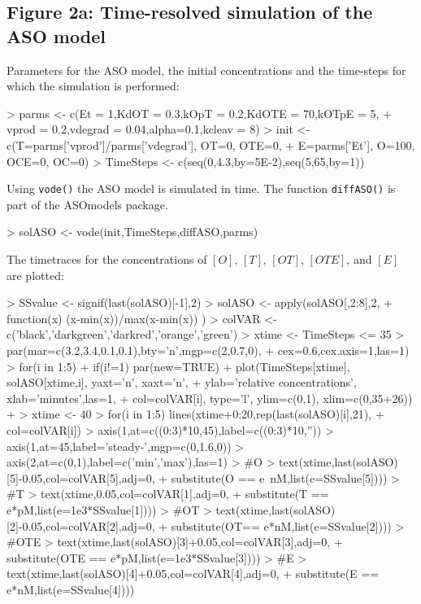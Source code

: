 \documentclass{article}
\begin{document}
\subsection*{Figure 2a: Time-resolved simulation of the ASO model}
Parameters for the ASO model, the initial concentrations and the time-steps for which the simulation is performed:
\begin{Schunk}
\begin{Sinput}
> parms <- c(Et = 1,KdOT = 0.3,kOpT = 0.2,KdOTE = 70,kOTpE = 5,  
+            vprod = 0.2,vdegrad = 0.04,alpha=0.1,kcleav = 8)
> init <- c(T=parms['vprod']/parms['vdegrad'], OT=0, OTE=0, 
+           E=parms['Et'], O=100, OCE=0, OC=0)
> TimeSteps <- c(seq(0,4.3,by=5E-2),seq(5,65,by=1))
\end{Sinput}
\end{Schunk}
Using \texttt{vode()} the ASO model is simulated in time. The function \texttt{diffASO()} is part of the ASOmodels package. 
\begin{Schunk}
\begin{Sinput}
> solASO <- vode(init,TimeSteps,diffASO,parms)
\end{Sinput}
\end{Schunk}
The timetraces for the concentrations of $[O]$, $[T]$, $[OT]$, $[OTE]$, and $[E]$ are plotted:
\begin{Schunk}
\begin{Sinput}
> SSvalue <- signif(last(solASO)[-1],2)
> solASO <- apply(solASO[,2:8],2,
+                 function(x) (x-min(x))/max(x-min(x)) )
> colVAR <- c('black','darkgreen','darkred','orange','green')
> xtime <- TimeSteps <= 35
> par(mar=c(3.2,3.4,0.1,0.1),bty='n',mgp=c(2,0.7,0),
+     cex=0.6,cex.axis=1,las=1)
> for(i in 1:5){ 
+   if(i!=1) par(new=TRUE)
+   plot(TimeSteps[xtime], solASO[xtime,i], yaxt='n', xaxt='n',
+        ylab='relative concentrations', xlab='minutes',las=1, 
+        col=colVAR[i], type='l', ylim=c(0,1), xlim=c(0,35+26))
+ }
> xtime <- 40
> for(i in 1:5) lines(xtime+0:20,rep(last(solASO)[i],21),
+                     col=colVAR[i])
> axis(1,at=c((0:3)*10,45),label=c((0:3)*10,''))
> axis(1,at=45,label='steady-\nstate',mgp=c(0,1.6,0))
> axis(2,at=c(0,1),label=c('min','max'),las=1)
> #O
> text(xtime,last(solASO)[5]-0.05,col=colVAR[5],adj=0,
+      substitute(O == e~nM,list(e=SSvalue[5])))
> #T
> text(xtime,0.05,col=colVAR[1],adj=0,
+      substitute(T == e*pM,list(e=1e3*SSvalue[1])))
> #OT
> text(xtime,last(solASO)[2]-0.05,col=colVAR[2],adj=0,
+      substitute(OT== e*nM,list(e=SSvalue[2])))
> #OTE
> text(xtime,last(solASO)[3]+0.05,col=colVAR[3],adj=0,
+      substitute(OTE == e*pM,list(e=1e3*SSvalue[3])))
> #E
> text(xtime,last(solASO)[4]+0.05,col=colVAR[4],adj=0,
+      substitute(E == e*nM,list(e=SSvalue[4])))
\end{Sinput}
\end{Schunk}
\end{document}
